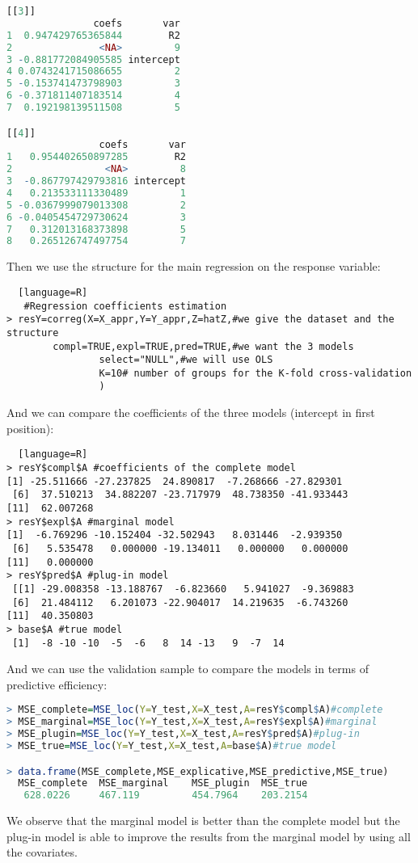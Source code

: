 \documentclass[12pt,a4paper]{report}
\begin{document}
\begin{appendices}
\begin{lstlisting}[language=R]
[[3]]
               coefs       var
1  0.947429765365844        R2
2               <NA>         9
3 -0.881772084905585 intercept
4 0.0743241715086655         2
5 -0.153741473798903         3
6 -0.371811407183514         4
7  0.192198139511508         5

[[4]]
                coefs       var
1   0.954402650897285        R2
2                <NA>         8
3  -0.867797429793816 intercept
4   0.213533111330489         1
5 -0.0367999079013308         2
6 -0.0405454729730624         3
7   0.312013168373898         5
8   0.265126747497754         7
\end{lstlisting}


Then we use the structure for the main regression on the response variable:
\begin{lstlisting}	[language=R]
   #Regression coefficients estimation
> resY=correg(X=X_appr,Y=Y_appr,Z=hatZ,#we give the dataset and the structure
   		compl=TRUE,expl=TRUE,pred=TRUE,#we want the 3 models
                select="NULL",#we will use OLS
                K=10# number of groups for the K-fold cross-validation
                )
                \end{lstlisting}
               And we can compare the coefficients of the three models (intercept in first position):
                \begin{lstlisting}	[language=R]
> resY$compl$A #coefficients of the complete model 
[1] -25.511666 -27.237825  24.890817  -7.268666 -27.829301
 [6]  37.510213  34.882207 -23.717979  48.738350 -41.933443
[11]  62.007268
> resY$expl$A #marginal model
[1]  -6.769296 -10.152404 -32.502943   8.031446  -2.939350
 [6]   5.535478   0.000000 -19.134011   0.000000   0.000000
[11]   0.000000
> resY$pred$A #plug-in model
 [[1] -29.008358 -13.188767  -6.823660   5.941027  -9.369883
 [6]  21.484112   6.201073 -22.904017  14.219635  -6.743260
[11]  40.350803
> base$A #true model
 [1]  -8 -10 -10  -5  -6   8  14 -13   9  -7  14
\end{lstlisting}
And we can use the validation sample to compare the models in terms of predictive efficiency:
\begin{lstlisting}[language=R]
> MSE_complete=MSE_loc(Y=Y_test,X=X_test,A=resY$compl$A)#complete
> MSE_marginal=MSE_loc(Y=Y_test,X=X_test,A=resY$expl$A)#marginal
> MSE_plugin=MSE_loc(Y=Y_test,X=X_test,A=resY$pred$A)#plug-in
> MSE_true=MSE_loc(Y=Y_test,X=X_test,A=base$A)#true model

> data.frame(MSE_complete,MSE_explicative,MSE_predictive,MSE_true)
  MSE_complete 	MSE_marginal 	MSE_plugin 	MSE_true
   628.0226  	467.119      	454.7964 	203.2154
\end{lstlisting}
We observe that the marginal model is better than the complete model but the plug-in model is able to improve the results from the marginal model by using all the covariates. \\


\end{appendices}
\end{document}
